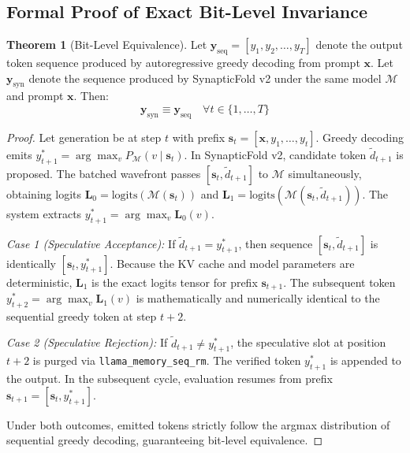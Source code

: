 \documentclass[journal,10pt,twocolumn]{article}
\theoremstyle{definition}
\newtheorem{theorem}{Theorem}
\begin{document}
\subsection{Formal Proof of Exact Bit-Level Invariance}

\begin{theorem}[Bit-Level Equivalence]
Let $\mathbf{y}_{\text{seq}} = [y_1, y_2, \dots, y_T]$ denote the output token sequence produced by autoregressive greedy decoding from prompt $\mathbf{x}$. Let $\mathbf{y}_{\text{syn}}$ denote the sequence produced by SynapticFold v2 under the same model $\mathcal{M}$ and prompt $\mathbf{x}$. Then:
\begin{equation}
\mathbf{y}_{\text{syn}} \equiv \mathbf{y}_{\text{seq}} \quad \forall t \in \{1, \dots, T\}
\end{equation}
\end{theorem}

\begin{proof}
Let generation be at step $t$ with prefix $\mathbf{s}_t = [\mathbf{x}, y_1, \dots, y_t]$. Greedy decoding emits $y_{t+1}^* = \arg\max_{v} P_{\mathcal{M}}(v \mid \mathbf{s}_t)$.
In SynapticFold v2, candidate token $\tilde{d}_{t+1}$ is proposed. The batched wavefront passes $[\mathbf{s}_t, \tilde{d}_{t+1}]$ to $\mathcal{M}$ simultaneously, obtaining logits $\mathbf{L}_0 = \text{logits}(\mathcal{M}(\mathbf{s}_t))$ and $\mathbf{L}_1 = \text{logits}(\mathcal{M}(\mathbf{s}_t, \tilde{d}_{t+1}))$.
The system extracts $y_{t+1}^* = \arg\max_v \mathbf{L}_0(v)$.

\textit{Case 1 (Speculative Acceptance):} If $\tilde{d}_{t+1} = y_{t+1}^*$, then sequence $[\mathbf{s}_t, \tilde{d}_{t+1}]$ is identically $[\mathbf{s}_t, y_{t+1}^*]$. Because the KV cache and model parameters are deterministic, $\mathbf{L}_1$ is the exact logits tensor for prefix $\mathbf{s}_{t+1}$. The subsequent token $y_{t+2}^* = \arg\max_v \mathbf{L}_1(v)$ is mathematically and numerically identical to the sequential greedy token at step $t+2$.

\textit{Case 2 (Speculative Rejection):} If $\tilde{d}_{t+1} \neq y_{t+1}^*$, the speculative slot at position $t+2$ is purged via \texttt{llama\_memory\_seq\_rm}. The verified token $y_{t+1}^*$ is appended to the output. In the subsequent cycle, evaluation resumes from prefix $\mathbf{s}_{t+1} = [\mathbf{s}_t, y_{t+1}^*]$. 

Under both outcomes, emitted tokens strictly follow the argmax distribution of sequential greedy decoding, guaranteeing bit-level equivalence.
\end{proof}
\end{document}
